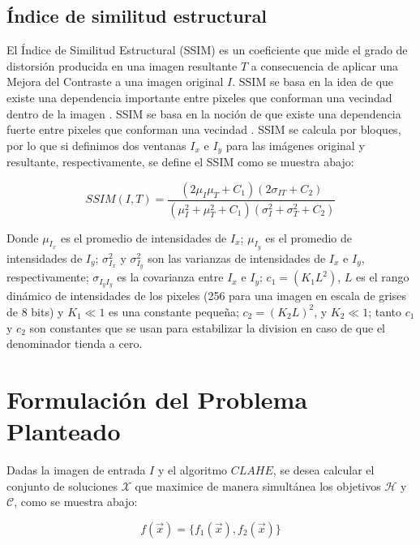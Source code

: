 \documentclass[spanish,twocolumn]{article}
\begin{document}
\subsection{Índice de similitud estructural}
\label{ssec:ssim}

El {Índice de Similitud Estructural (SSIM)} \cite{wang2004image} es un coeficiente que mide el grado de distorsión producida en una imagen resultante $T$ a consecuencia de aplicar una Mejora del Contraste a una imagen original $I$. SSIM se basa en la idea de que existe una dependencia importante entre pixeles que conforman una vecindad dentro de la imagen \cite{kwok2013locally}. SSIM se basa en la noción de que existe una dependencia fuerte entre pixeles que conforman una vecindad \cite{kwok2013locally}. SSIM se calcula por bloques, por lo que si definimos dos ventanas $I_x$ e $I_y$ para las imágenes original y resultante, respectivamente, se define el SSIM como se muestra abajo:

\begin{equation}\label{eq:ssim}
SSIM(I,T)=\frac{(2\mu_I\mu_T+C_1)(2\sigma_{IT}+C_2)}{(\mu_I^2+\mu_T^2+C_1)(\sigma_I^2+\sigma_T^2+C_2)}
\end{equation}

Donde $\mu_{I_x}$ es el promedio de intensidades de $I_x$; $\mu_{I_y}$ es el promedio de intensidades de $I_y$; $\sigma_{I_x}^2$ y $\sigma_{I_y}^2$ son las varianzas de intensidades de $I_x$ e $I_y$, respectivamente; $\sigma_{I_y I_y}$ es la covarianza entre $I_x$ e $I_y$; $c_1=(K_1L^2)$, $L$ es el rango dinámico de intensidades de los pixeles (256 para una imagen en escala de grises de 8 bits) y $K_1 \ll 1$ es una constante pequeña; $c_2=(K_2 L)^2$, y $K_2 \ll 1$; tanto $c_1$ y $c_2$ son constantes que se usan para estabilizar la division en caso de que el denominador tienda a cero.

\section{Formulación del Problema Planteado}
\label{sec:formulacion}

Dadas la imagen de entrada $I$ y el algoritmo $CLAHE$, se desea calcular el conjunto de soluciones $\mathscr{X}$ que maximice de manera simultánea los objetivos $\mathscr{H}$ y $\mathcal{C}$, como se muestra abajo:

\begin{equation}\label{eq:fitness}
    f(\overrightarrow{x}) = \{ f_1(\overrightarrow{x}), f_2(\overrightarrow{x}) \}
\end{equation}
\end{document}
